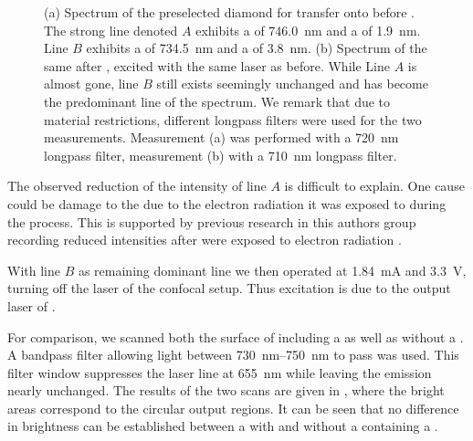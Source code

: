 \begin{figure}[!htb]
\begin{subfigure}[t]{ 0.49\linewidth}
			\caption{}
			\label{subfig::spectrum_vcsel_confocal_excitation_with_diamond}
		\end{subfigure}
		\caption[\Siv properties before and after \pp]{(a) Spectrum of the preselected diamond for transfer onto \BmFour before \pp. The strong line denoted $A$ exhibits a \cwl of \SI{746.0}{nm} and a \lw of \SI{1.9}{nm}. Line $B$ exhibits a \cwl of \SI{734.5}{\nm} and a \lw of \SI{3.8}{\nm}. (b) Spectrum of the same \nd after \pp, excited with the same laser as before. While Line $A$ is almost gone, line $B$ still exists seemingly unchanged and has become the predominant line of the spectrum. We remark that due to material restrictions, different longpass filters were used for the two measurements. Measurement (a) was performed with a \SI{720}{nm} longpass filter, measurement (b) with a \SI{710}{nm} longpass filter.}
		\label{fig::spectrum_vcsel_diamond}
	\end{figure}

	The observed reduction of the intensity of line $A$ is difficult to explain. One cause could be damage to the \cc due to the electron radiation it was exposed to during the \pp process. This is supported by previous research in this authors group recording reduced \fl intensities after \ccs were exposed to electron radiation \cite{MeyerBaccThesis}.

	With line $B$ as remaining dominant line we then operated \BmFour at \SI{1.84}{mA} and \SI{3.3}{V}, turning off the laser of the confocal setup.
	Thus \siv excitation is due to the output laser of \BmFour.

	For comparison, we scanned both the surface of \BmFour including a \nd as well as \BmTwo without a \nd. A bandpass filter allowing light between \SIrange{730}{750}{\nm} to pass was used.
	This filter window suppresses the \VCSEL laser line at \SI{655}{\nm} while leaving the \siv emission nearly unchanged. The results of the two scans are given in , where the bright areas correspond to the circular \VCSEL output regions. It can be seen that no difference in brightness can be established between a \VCSEL with and without a \nd containing a \siv.

